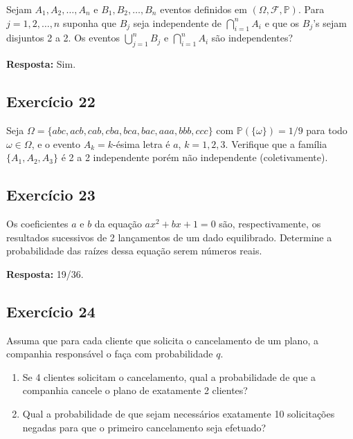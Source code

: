 \documentclass[
  letterpaper,
  DIV=11,
  numbers=noendperiod]{scrartcl}
\begin{document}
Sejam \(A_1, A_2, \ldots, A_n\) e \(B_1, B_2, \ldots, B_n\) eventos
definidos em \((\Omega, \mathcal{F}, \mathbb{P})\). Para
\(j = 1, 2, \ldots, n\) suponha que \(B_j\) seja independente de
\(\bigcap_{i=1}^n A_i\) e que os \(B_j\)'s sejam disjuntos 2 a 2. Os
eventos \(\bigcup_{j=1}^n B_j\) e \(\bigcap_{i=1}^n A_i\) são
independentes?

\textbf{Resposta:} Sim.

\hypertarget{exercuxedcio-22}{%
\subsection{Exercício 22}\label{exercuxedcio-22}}

Seja \(\Omega = \{abc, acb, cab, cba, bca, bac, aaa, bbb, ccc\}\) com
\(\mathbb{P}(\{\omega\}) = 1/9\) para todo \(\omega \in \Omega\), e o
evento \(A_k = k\)-ésima letra é \(a\), \(k = 1, 2, 3\). Verifique que a
família \(\{A_1, A_2, A_3\}\) é 2 a 2 independente porém não
independente (coletivamente).

\hypertarget{exercuxedcio-23}{%
\subsection{Exercício 23}\label{exercuxedcio-23}}

Os coeficientes \(a\) e \(b\) da equação \(ax^2 + bx + 1 = 0\) são,
respectivamente, os resultados sucessivos de 2 lançamentos de um dado
equilibrado. Determine a probabilidade das raízes dessa equação serem
números reais.

\textbf{Resposta:} 19/36.

\hypertarget{exercuxedcio-24}{%
\subsection{Exercício 24}\label{exercuxedcio-24}}

Assuma que para cada cliente que solicita o cancelamento de um plano, a
companhia responsável o faça com probabilidade \(q\).

\begin{enumerate}
\def\labelenumi{(\alph{enumi})}
\item
  Se 4 clientes solicitam o cancelamento, qual a probabilidade de que a
  companhia cancele o plano de exatamente 2 clientes?
\item
  Qual a probabilidade de que sejam necessários exatamente 10
  solicitações negadas para que o primeiro cancelamento seja efetuado?
\end{enumerate}
\end{document}
